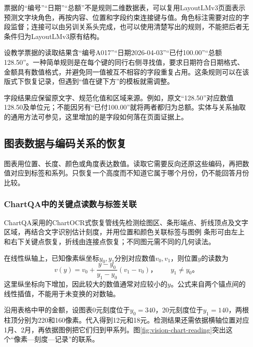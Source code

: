 票据的“编号”“日期”“总额”不是规则二维数据表，可以复用LayoutLMv3页面表示预测文字块角色，再按内容、位置和字段约束连接键与值。角色标注需要对应的字段监督；连接可以由另训关系头完成，也可以使用清楚写出的规则，不能把后者无条件归为LayoutLMv3原有结构。

设教学票据的读取结果含“编号A017”“日期2026-04-03”“已付100.00”“总额128.50”。一种简单规则是在每个键的同行右侧寻找值，要求日期符合日期格式、金额具有数值格式，并避免同一值被互不相容的字段重复占用。这条规则可以在该版式下恢复记录，但遇到“值在键下方”的模板就需调整。

字段结果应保留原文字、规范化值和区域来源。例如，原文“128.50”对应数值128.50及单位元；不能因另有“已付100.00”就将两者都归为总额。实体与关系抽取的通用方法可参见，这里增加的是字段如何落在页面证据上。

\subsection{图表数据与编码关系的恢复}
\label{sec:vision-understanding-charts}

图表用位置、长度、颜色或角度表达数值。读取它需要反向还原这些编码，再把数值对应到标签和系列。只恢复一个高度而不知道它属于哪个月份，仍不能回答月份比较。

\subsubsection{ChartQA中的关键点读数与标签关联}
\label{sec:vision-understanding-chart-reading}

ChartQA采用的ChartOCR式恢复管线先检测绘图区、条形端点、折线顶点及文字区域，再结合文字识别估计刻度，并用位置和颜色关联标签与图例
条形可由左上和右下关键点恢复，折线由连接点恢复；不同图元需不同的几何读法。

在线性纵轴上，已知像素纵坐标$y_0,y_1$分别对应数值$v_0,v_1$，则位置$y$的读数为
\begin{equation}
  v(y)=v_0+\frac{y-y_0}{y_1-y_0}(v_1-v_0)\text{，}
  \qquad y_1\neq y_0\text{。}
  \label{eq:vision-chart-calibration}
\end{equation}
这里纵坐标向下增加，因此较大的数值通常对应较小的$y$。公式来自两个锚点间的线性插值，不能用于未变换的对数轴。

沿用表格中甲的金额，设图表0元刻度位于$y_0=340$，20元刻度位于$y_1=140$，两根柱顶分别为220和160像素。代入得到12元和18元。检测结果还需依据横轴位置对应1月、2月，再依据图例把它们归到甲系列。图\ref{fig:vision-chart-reading}突出这个“像素—刻度—记录”的联系。

